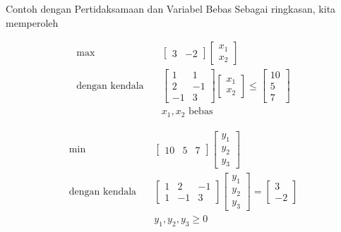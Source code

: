 \begin{example}{Contoh dengan Pertidaksamaan dan Variabel Bebas}{}
Sebagai ringkasan, kita memperoleh

\par\noindent
\begin{tcolorbox}[title=Primal (P), colback=blue!5, colframe=blue!60!black, sharp corners=south]
\[
\begin{aligned}
\max \quad &
\begin{bmatrix} 3 & -2 \end{bmatrix}
\begin{bmatrix} x_1 \\ x_2 \end{bmatrix} \\[0.5em]
\text{dengan kendala} \quad &
\begin{bmatrix}
1 & 1 \\
2 & -1 \\
-1 & 3
\end{bmatrix}
\begin{bmatrix} x_1 \\ x_2 \end{bmatrix}
\leq
\begin{bmatrix} 10 \\ 5 \\ 7 \end{bmatrix} \\[0.5em]
& x_1, x_2 \text{ bebas}
\end{aligned}
\]
\end{tcolorbox}

\medskip

\begin{tcolorbox}[title=Dual (D), colback=green!5, colframe=green!60!black, sharp corners=south]
\[
\begin{aligned}
\min \quad &
\begin{bmatrix} 10 & 5 & 7 \end{bmatrix}
\begin{bmatrix} y_1 \\ y_2 \\ y_3 \end{bmatrix} \\[0.5em]
\text{dengan kendala} \quad &
\begin{bmatrix}
1 & 2 & -1 \\
1 & -1 & 3
\end{bmatrix}
\begin{bmatrix} y_1 \\ y_2 \\ y_3 \end{bmatrix}
=
\begin{bmatrix} 3 \\ -2 \end{bmatrix} \\[0.5em]
& y_1, y_2, y_3 \geq 0
\end{aligned}
\]
\end{tcolorbox}
\par


\end{example}
